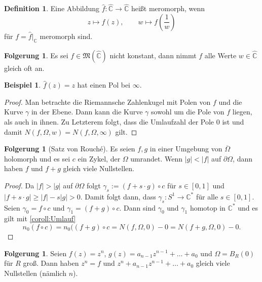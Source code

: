 \documentclass[11pt,titlepage]{article}
\theoremstyle{definition}
\newtheorem{corollary}[theorem]{Folgerung}
\newtheorem{definition}[theorem]{Definition}
\newtheorem{example}[theorem]{Beispiel}
\theoremstyle{remark}
\begin{document}
	\begin{definition}
		Eine Abbildung $\hat{f}:\hat{\mathbb{C}}\to\hat{\mathbb{C}}$ heißt meromorph, wenn 
		\[ z\mapsto f(z), \qquad w\mapsto f\left(\frac{1}{w}\right) \]
		für $f=\hat{f}|_{\mathbb{C}}$ meromorph sind.
	\end{definition}
	
	\begin{corollary}
		Es sei $f\in\mathfrak{M}(\hat{\mathbb{C}})$ nicht konstant, dann nimmt $f$ alle Werte 
		$w\in\hat{\mathbb{C}}$ gleich oft an.
	\end{corollary}
	
	\begin{example}
		$\hat{f}(z)=z$ hat einen Pol bei $\infty$.
	\end{example}
	
	\begin{proof}
	
		
		
		Man betrachte die Riemannsche Zahlenkugel mit Polen von $f$ und die Kurve $\gamma$ in der 
		Ebene. Dann kann die Kurve $\gamma$ sowohl um die Pole von $f$ liegen, als auch in ihnen.
		Zu Letzterem folgt, dass die Umlaufzahl der Pole $0$ ist und damit 
		$N(f,\Omega,w)=N(f,\Omega,\infty)$ gilt.
	\end{proof}
	
	\begin{corollary}[Satz von Rouché]
		Es seien $f,g$ in einer Umgebung von $\overline{\Omega}$ holomorph und es sei $c$ ein Zykel, 
		der $\Omega$ umrandet. Wenn $|g|<|f|$ auf $\partial\Omega$, dann haben $f$ und $f+g$ 
		gleich viele Nullstellen.
	\end{corollary}
	
	\begin{proof}
		Da $|f|>|g|$ auf $\partial\Omega$ folgt $\gamma_s := (f+s\cdot g)\circ c$ für $s\in [0,1]$ und 
		$|f+s\cdot g|\geq |f|-s|g| >0$. Damit folgt dann, dass $\gamma_s:S^1\to\mathbb{C}^*$ für alle 
		$s\in [0,1]$. Seien $\gamma_0=f\circ c$ und $\gamma_1=(f+g)\circ c$. Dann sind 
		$\gamma_0$ und $\gamma_1$ homotop in $\mathbb{C}^*$ und es gilt mit \ref{coroll:Umlauf}
		\[ n_0(f\circ c) =n_0((f+g)\circ c = N(f,\Omega,0)-0=N(f+g,\Omega,0)-0. \]
	\end{proof}
	
	\begin{corollary}
		Seien $f(z)=z^n$, $g(z)=a_{n-1}z^{n-1}+\ldots+a_0$ und $\Omega=B_R(0)$ für $R$ groß. Dann 
		haben $z^n=f$ und $z^n+a_{n-1}z^{n-1}+\ldots+a_0$ gleich viele Nullstellen (nämlich $n$).
	\end{corollary}
		
		
\end{document}
